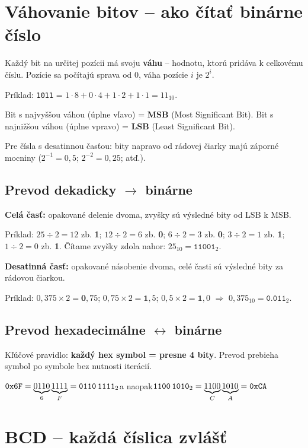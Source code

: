 \section{Váhovanie bitov -- ako čítať binárne číslo}

Každý bit na určitej pozícii má svoju \textbf{váhu} -- hodnotu, ktorú pridáva k celkovému číslu. Pozície sa počítajú sprava od 0, váha pozície $i$ je $2^i$.

Príklad: \texttt{1011} = $1{\cdot}8 + 0{\cdot}4 + 1{\cdot}2 + 1{\cdot}1 = 11_{10}$.

Bit s najvyššou váhou (úplne vľavo) = \textbf{MSB} (Most Significant Bit). Bit s najnižšou váhou (úplne vpravo) = \textbf{LSB} (Least Significant Bit).

Pre čísla s desatinnou časťou: bity napravo od rádovej čiarky majú záporné mocniny ($2^{-1} = 0{,}5$; $2^{-2} = 0{,}25$; atď.).

\subsection{Prevod dekadicky $\to$ binárne}

\textbf{Celá časť:} opakované delenie dvoma, zvyšky sú výsledné bity od LSB k MSB.

Príklad: $25 \div 2 = 12$ zb. \textbf{1}; $12 \div 2 = 6$ zb. \textbf{0}; $6 \div 2 = 3$ zb. \textbf{0}; $3 \div 2 = 1$ zb. \textbf{1}; $1 \div 2 = 0$ zb. \textbf{1}. Čítame zvyšky zdola nahor: $25_{10} = \texttt{11001}_2$.

\textbf{Desatinná časť:} opakované násobenie dvoma, celé časti sú výsledné bity za rádovou čiarkou.

Príklad: $0{,}375 \times 2 = \mathbf{0}{,}75$; $0{,}75 \times 2 = \mathbf{1}{,}5$; $0{,}5 \times 2 = \mathbf{1}{,}0$ $\Rightarrow$ $0{,}375_{10} = \texttt{0.011}_2$.

\subsection{Prevod hexadecimálne $\leftrightarrow$ binárne}

Kľúčové pravidlo: \textbf{každý hex symbol = presne 4 bity}. Prevod prebieha symbol po symbole bez nutnosti iterácií.

$\texttt{0x6F} = \underbrace{0110}_{6}\underbrace{1111}_{F} = \texttt{0110\,1111}_2$\quad a naopak\quad $\texttt{1100\,1010}_2 = \underbrace{1100}_{C}\underbrace{1010}_{A} = \texttt{0xCA}$

\section{BCD -- každá číslica zvlášť}

